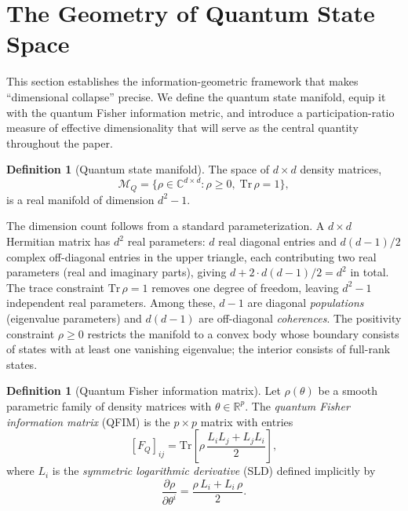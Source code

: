 \documentclass[12pt,a4paper]{article}
\theoremstyle{definition}
\newtheorem{definition}[theorem]{Definition}
\theoremstyle{remark}
\begin{document}
\section{The Geometry of Quantum State Space}
\label{sec:geometry}

This section establishes the information-geometric framework that makes ``dimensional collapse'' precise. We define the quantum state manifold, equip it with the quantum Fisher information metric, and introduce a participation-ratio measure of effective dimensionality that will serve as the central quantity throughout the paper.

\begin{definition}[Quantum state manifold]
\label{def:state-manifold}
The space of $d \times d$ density matrices,
\begin{equation}
\label{eq:state-manifold}
\mathcal{M}_Q = \bigl\{\rho \in \mathbb{C}^{d \times d} : \rho \geq 0,\; \mathrm{Tr}\,\rho = 1\bigr\},
\end{equation}
is a real manifold of dimension $d^2 - 1$.
\end{definition}

The dimension count follows from a standard parameterization. A $d \times d$ Hermitian matrix has $d^2$ real parameters: $d$ real diagonal entries and $d(d-1)/2$ complex off-diagonal entries in the upper triangle, each contributing two real parameters (real and imaginary parts), giving $d + 2 \cdot d(d-1)/2 = d^2$ in total. The trace constraint $\mathrm{Tr}\,\rho = 1$ removes one degree of freedom, leaving $d^2 - 1$ independent real parameters. Among these, $d - 1$ are diagonal \emph{populations} (eigenvalue parameters) and $d(d-1)$ are off-diagonal \emph{coherences}. The positivity constraint $\rho \geq 0$ restricts the manifold to a convex body whose boundary consists of states with at least one vanishing eigenvalue; the interior consists of full-rank states.

\begin{definition}[Quantum Fisher information matrix]
\label{def:qfim}
Let $\rho(\theta)$ be a smooth parametric family of density matrices with $\theta \in \mathbb{R}^p$. The \emph{quantum Fisher information matrix} (QFIM) is the $p \times p$ matrix with entries
\begin{equation}
\label{eq:qfim}
[F_Q]_{ij} = \mathrm{Tr}\!\left[\rho\,\frac{L_i L_j + L_j L_i}{2}\right],
\end{equation}
where $L_i$ is the \emph{symmetric logarithmic derivative} (SLD) defined implicitly by
\begin{equation}
\label{eq:sld}
\frac{\partial \rho}{\partial \theta^i} = \frac{\rho\, L_i + L_i\, \rho}{2}.
\end{equation}
\end{definition}
\end{document}
